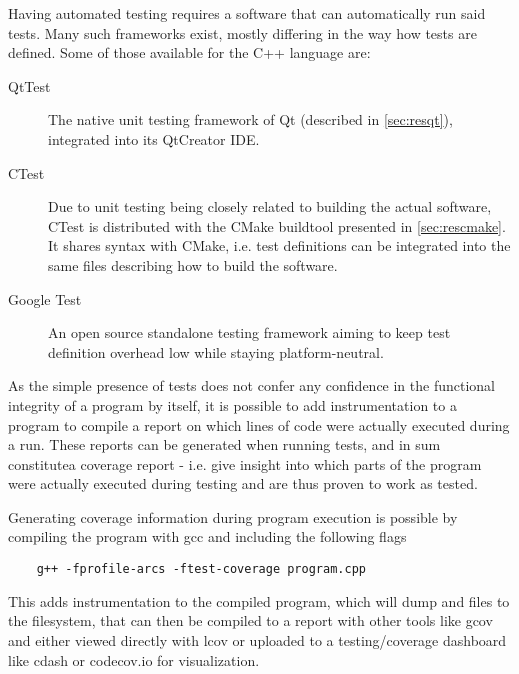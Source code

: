 Having automated testing requires a software that can automatically run said tests. Many such frameworks exist, mostly differing in the way how tests are defined. Some of those available for the C++ language are:
\begin{description}
	\item[QtTest] The native unit testing framework of Qt (described in \ref{sec:resqt}), integrated into its QtCreator IDE.
	\item[CTest] Due to unit testing being closely related to building the actual software, CTest is distributed with the CMake buildtool presented in \ref{sec:rescmake}. It shares syntax with CMake, i.e. test definitions can be integrated into the same files describing how to build the software.
	\item[Google Test]  An open source standalone testing framework aiming to keep test definition overhead low while staying platform-neutral.
\end{description}

As the simple presence of tests does not confer any confidence in the functional integrity of a program by itself, it is possible to add instrumentation to a program to compile a report on which lines of code were actually executed during a run. These reports can be generated when running tests, and in sum constitutea \gls{coverage} report - i.e. give insight into which parts of the program were actually executed during testing and are thus proven to work as tested.

Generating coverage information during program execution is possible by compiling the program with gcc and including the following flags
\begin{lstlisting}
	g++ -fprofile-arcs -ftest-coverage program.cpp
\end{lstlisting}

This adds instrumentation to the compiled program, which will dump  and  files to the filesystem, that can then be compiled to a report with other tools like gcov and either viewed directly with lcov or uploaded to a testing/coverage dashboard like cdash or codecov.io for visualization.

